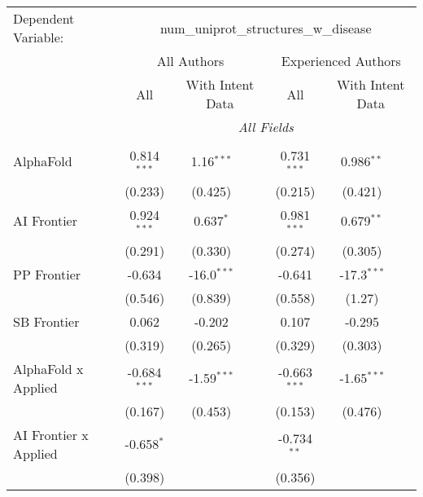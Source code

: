 \begingroup
\centering
\begin{tabular}{lcccccc}
   \tabularnewline \midrule \midrule
   Dependent Variable: & \multicolumn{6}{c}{num\_uniprot\_structures\_w\_disease}\\
 & \multicolumn{3}{c}{All Authors} & \multicolumn{3}{c}{Experienced Authors} \\
\cmidrule(lr){2-4} \cmidrule(lr){5-7}
 & \multicolumn{1}{c}{All} & \multicolumn{2}{c}{With Intent Data} & \multicolumn{1}{c}{All} & \multicolumn{2}{c}{With Intent Data} \\
\cmidrule(lr){2-2} \cmidrule(lr){3-4} \cmidrule(lr){5-5} \cmidrule(lr){6-7}
 & \multicolumn{6}{c}{\textit{All Fields}} \\ \\
   AlphaFold                    & 0.814$^{***}$  & 1.16$^{***}$  &               & 0.731$^{***}$  & 0.986$^{**}$  &   \\   
                                & (0.233)        & (0.425)       &               & (0.215)        & (0.421)       &   \\   
   AI Frontier                  & 0.924$^{***}$  & 0.637$^{*}$   &               & 0.981$^{***}$  & 0.679$^{**}$  &   \\   
                                & (0.291)        & (0.330)       &               & (0.274)        & (0.305)       &   \\   
   PP Frontier                  & -0.634         & -16.0$^{***}$ &               & -0.641         & -17.3$^{***}$ &   \\   
                                & (0.546)        & (0.839)       &               & (0.558)        & (1.27)        &   \\   
   SB Frontier                  & 0.062          & -0.202        &               & 0.107          & -0.295        &   \\   
                                & (0.319)        & (0.265)       &               & (0.329)        & (0.303)       &   \\   
   AlphaFold x Applied          & -0.684$^{***}$ & -1.59$^{***}$ &               & -0.663$^{***}$ & -1.65$^{***}$ &   \\   
                                & (0.167)        & (0.453)       &               & (0.153)        & (0.476)       &   \\   
   AI Frontier x Applied        & -0.658$^{*}$   &               &               & -0.734$^{**}$  &               &   \\   
                                & (0.398)        &               &               & (0.356)        &               &   \\   

\end{tabular}
